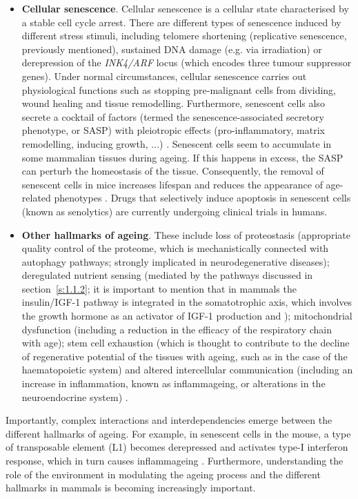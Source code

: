 \begin{itemize}
	\item \textbf{Cellular senescence}. Cellular senescence is a cellular state characterised by a stable cell cycle arrest. There are different types of senescence induced by different stress stimuli, including telomere shortening (replicative senescence, previously mentioned), sustained DNA damage (e.g. via irradiation) or derepression of the \textit{INK4/ARF} locus (which encodes three tumour suppressor genes)\cite{Lopez-Otin2013,Herranz2018}. Under normal circumstances, cellular senescence carries out physiological functions such as stopping pre-malignant cells from dividing, wound healing and tissue remodelling. Furthermore, senescent cells also secrete a cocktail of factors (termed the senescence-associated secretory phenotype, or \acrshort{SASP}) with pleiotropic effects (pro-inflammatory, matrix remodelling, inducing growth, ...) \cite{Herranz2018}. Senescent cells seem to accumulate in some mammalian tissues during ageing. If this happens in excess, the SASP can perturb the homeostasis of the tissue. Consequently, the removal of senescent cells in mice increases lifespan and reduces the appearance of age-related phenotypes \cite{Baker2011,Baker2016,Xu2018}. Drugs that selectively induce apoptosis in senescent cells (known as senolytics) \cite{Kirkland2017} are currently undergoing clinical trials in humans. 
	
	\item \textbf{Other hallmarks of ageing}. These include loss of proteostasis (appropriate quality control of the proteome, which is mechanistically connected with autophagy pathways; strongly implicated in neurodegenerative diseases); deregulated nutrient sensing (mediated by the pathways discussed in section~\ref{s:1.1.2}; it is important to mention that in mammals the insulin/IGF-1 pathway is integrated in the somatotrophic axis, which involves the growth hormone as an activator of IGF-1 production and ); mitochondrial dysfunction (including a reduction in the efficacy of the respiratory chain with age); stem cell exhaustion (which is thought to contribute to the decline of regenerative potential of the tissues with ageing, such as in the case of the haematopoietic system) and altered intercellular communication (including an increase in inflammation, known as inflammageing, or alterations in the neuroendocrine system) \cite{Lopez-Otin2013}.

	
\end{itemize}

Importantly, complex interactions and interdependencies emerge between the different hallmarks of ageing. For example, in senescent cells in the mouse, a type of transposable element (L1) becomes derepressed and activates type-I interferon response, which in turn causes inflammageing \cite{DeCecco2019}. Furthermore, understanding the role of the environment in modulating the ageing process and the different hallmarks in mammals is becoming increasingly important.  

